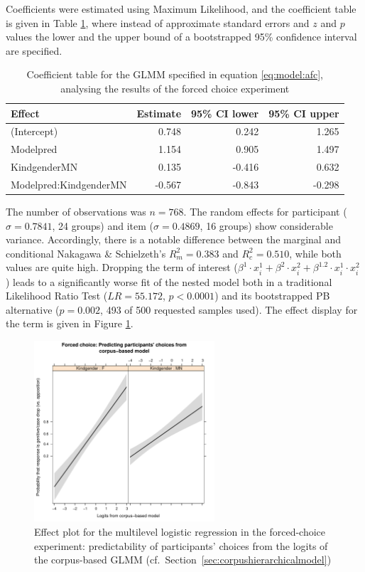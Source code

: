 \documentclass[USenglish]{article}
\begin{document}
Coefficients were estimated using Maximum Likelihood, and the coefficient table is given in Table \ref{tab:afc:model}, where instead of approximate standard errors and $z$ and $p$ values the lower and the upper bound of a bootstrapped 95\% confidence interval are specified.

\begin{table}
  \centering
  \begin{tabular}{lrrr}
    Effect & Estimate & 95\% CI lower & 95\% CI upper \\
    \midrule
    (Intercept)            &  0.748  &  0.242  &  1.265 \\
    Modelpred              &  1.154  &  0.905  &  1.497 \\
    KindgenderMN           &  0.135  & -0.416  &  0.632 \\
    Modelpred:KindgenderMN & -0.567  & -0.843  & -0.298 \\
  \end{tabular}
  \caption{Coefficient table for the GLMM specified in equation \ref{eq:model:afc}, analysing the results of the forced choice experiment}
  \label{tab:afc:model}
\end{table}

The number of observations was $n=768$.
The random effects for participant ($\sigma=0.7841$, 24 groups) and item ($\sigma=0.4869$, 16 groups) show considerable variance.
Accordingly, there is a notable difference between the marginal and conditional Nakagawa \& Schielzeth's $R^2_{m}=0.383$ and $R^2_{c}=0.510$, while both values are quite high.
Dropping the term of interest ($\beta^1\cdot x_i^1+\beta^2\cdot x_i^2+\beta^{1.2}\cdot x_i^1\cdot x_i^2$) leads to a significantly worse fit of the nested model both in a traditional Likelihood Ratio Test ($LR=55.172$, $p<0.0001$) and its bootstrapped PB alternative ($p = 0.002$, 493 of 500 requested samples used).
The effect display for the term is given in Figure \ref{fig:afc:effects}.

\begin{figure}[h]
\centering
\includegraphics[width=0.6\textwidth]{figures/experiment/2afc_effects}
\caption{Effect plot for the multilevel logistic regression in the forced-choice experiment: predictability of participants' choices from the logits of the corpus-based GLMM (cf.\ Section~\ref{sec:corpushierarchicalmodel})}
\label{fig:afc:effects}
\end{figure}
\end{document}
